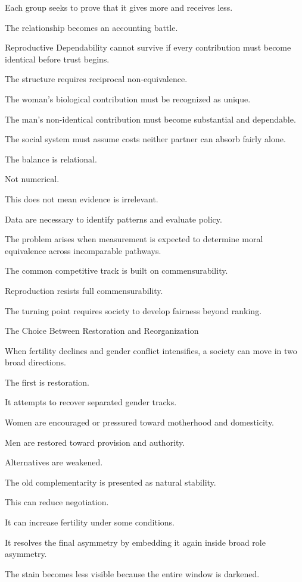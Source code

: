 Each group seeks to prove that it gives more and receives less.

The relationship becomes an accounting battle.

Reproductive Dependability cannot survive if every contribution must become identical before trust begins.

The structure requires reciprocal non-equivalence.

The woman’s biological contribution must be recognized as unique.

The man’s non-identical contribution must become substantial and dependable.

The social system must assume costs neither partner can absorb fairly alone.

The balance is relational.

Not numerical.

This does not mean evidence is irrelevant.

Data are necessary to identify patterns and evaluate policy.

The problem arises when measurement is expected to determine moral equivalence across incomparable pathways.

The common competitive track is built on commensurability.

Reproduction resists full commensurability.

The turning point requires society to develop fairness beyond ranking.

The Choice Between Restoration and Reorganization

When fertility declines and gender conflict intensifies, a society can move in two broad directions.

The first is restoration.

It attempts to recover separated gender tracks.

Women are encouraged or pressured toward motherhood and domesticity.

Men are restored toward provision and authority.

Alternatives are weakened.

The old complementarity is presented as natural stability.

This can reduce negotiation.

It can increase fertility under some conditions.

It resolves the final asymmetry by embedding it again inside broad role asymmetry.

The stain becomes less visible because the entire window is darkened.

